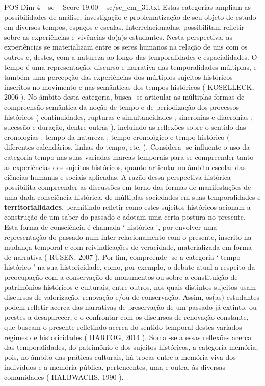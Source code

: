 \begin{textsample}{POS Dim 4 – sc – Score 19.00 – sc/sc\_em\_31.txt}
Estas categorias ampliam as possibilidades de análise, investigação e problematização de seu objeto de estudo em diversos tempos, espaços e escalas.
Interrelacionadas, possibilitam refletir sobre as experiências e vivências do(a)s estudantes.
Nesta perspectiva, as experiências se materializam entre os seres humanos na relação de uns com os outros e, destes, com a natureza ao longo das temporalidades e espacialidades.
O tempo é uma representação, discurso e narrativa das temporalidades múltiplas, e também uma percepção das experiências dos múltiplos sujeitos históricos inscritos no movimento e nas semânticas dos tempos históricos ( KOSELLECK, 2006 ).
No âmbito desta categoria, busca -se articular as múltiplas formas de compreensão semântica da noção de tempo e de periodização dos processos históricos ( continuidades, rupturas e simultaneidades ; sincronias e diacronias ; sucessão e duração, dentre outras ), incluindo as reflexões sobre o sentido das cronologias : tempo da natureza ; tempo cronológico e tempo histórico ( diferentes calendários, linhas do tempo, etc. ).
Considera -se influente o uso da categoria tempo nas suas variadas marcas temporais para se compreender tanto as experiências dos sujeitos históricos, quanto articular no âmbito escolar das ciências humanas e sociais aplicadas.
A razão dessa perspectiva histórica possibilita compreender as discussões em torno das formas de manifestações de uma dada consciência histórica, de múltiplas sociedades em suas temporalidades e \textbf{territorialidades}, permitindo refletir como estes sujeitos históricos acionam a construção de um saber do passado e adotam uma certa postura no presente.
Esta forma de consciência é chamada ‘ histórica ’, por envolver uma representação do passado num inter-relacionamento com o presente, inscrito na mudança temporal e com reivindicações de veracidade, materializada em forma de narrativa ( RÜSEN, 2007 ).
Por fim, compreende -se a categoria ‘ tempo histórico ’ na sua historicidade, como, por exemplo, o debate atual a respeito da preocupação com a conservação de monumentos ou sobre a constituição de patrimônios históricos e culturais, entre outros, nos quais distintos sujeitos usam discursos de valorização, renovação e/ou de conservação.
Assim, os(as) estudantes podem refletir acerca das narrativas de preservação de um passado já extinto, ou prestes a desaparecer, e o confrontar com os discursos de renovação constante, que buscam o presente refletindo acerca do sentido temporal destes variados regimes de historicidades ( HARTOG, 2014 ).
Soma -se a essas reflexões acerca das temporalidades, do patrimônio e dos sujeitos históricos, a categoria memória, pois, no âmbito das práticas culturais, há trocas entre a memória viva dos indivíduos e a memória pública, pertencentes, uma e outra, às diversas comunidades ( HALBWACHS, 1990 ).

\end{textsample}
